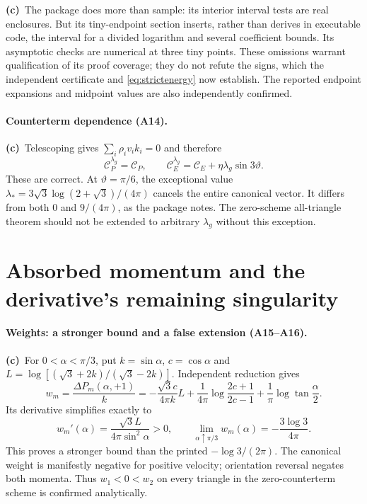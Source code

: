 \documentclass[11pt,a4paper]{article}
\newcommand{\Lc}{\textbf{(c)}\ }
\newcommand{\file}[1]{\texttt{\detokenize{#1}}}
\begin{document}
\Lc The package does more than sample: its interior interval tests are
real enclosures. But its tiny-endpoint section inserts, rather than derives
in executable code, the interval \file{["2.309", "2.310"]} for a divided
logarithm and several coefficient bounds. Its asymptotic checks are numerical
at three tiny points. These omissions warrant qualification of its proof
coverage; they do not refute the signs, which the independent certificate
and \eqref{eq:strictenergy} now establish. The reported endpoint expansions
and midpoint values are also independently confirmed.

\paragraph{Counterterm dependence (A14).}
\Lc Telescoping gives $\sum_i\rho_iv_ik_i=0$ and therefore
\begin{equation}
 \mathcal C_P^{\lambda_g}=\mathcal C_P,\qquad
 \mathcal C_E^{\lambda_g}=\mathcal C_E+\eta\lambda_g\sin3\vartheta.
\end{equation}
These are correct. At $\vartheta=\pi/6$, the exceptional value
$\lambda_*={3\sqrt3}\log(2+\sqrt3)/(4\pi)$ cancels the entire canonical
vector. It differs from both $0$ and $9/(4\pi)$, as the package notes.
The zero-scheme all-triangle theorem should not be extended to arbitrary
$\lambda_g$ without this exception.

\section{Absorbed momentum and the derivative's remaining singularity}
\paragraph{Weights: a stronger bound and a false extension (A15--A16).}
\Lc For $0<\alpha<\pi/3$, put $k=\sin\alpha$, $c=\cos\alpha$ and
$L=\log[(\sqrt3+2k)/(\sqrt3-2k)]$. Independent reduction gives
\begin{equation}
 w_m=\frac{\Delta P_m(\alpha,+1)}{k}
 =-\frac{\sqrt3c}{4\pi k}L
  +\frac1{4\pi}\log\frac{2c+1}{2c-1}
  +\frac1\pi\log\tan\frac\alpha2.
\end{equation}
Its derivative simplifies exactly to
\begin{equation}
 w_m'(\alpha)=\frac{\sqrt3 L}{4\pi\sin^2\alpha}>0,\qquad
 \lim_{\alpha\uparrow\pi/3}w_m(\alpha)=-\frac{3\log3}{4\pi}.
\end{equation}
This proves a stronger bound than the printed $-\log3/(2\pi)$.
The canonical weight is manifestly negative for positive velocity;
orientation reversal negates both momenta. Thus $w_1<0<w_2$ on every
triangle in the zero-counterterm scheme is confirmed analytically.
\end{document}
